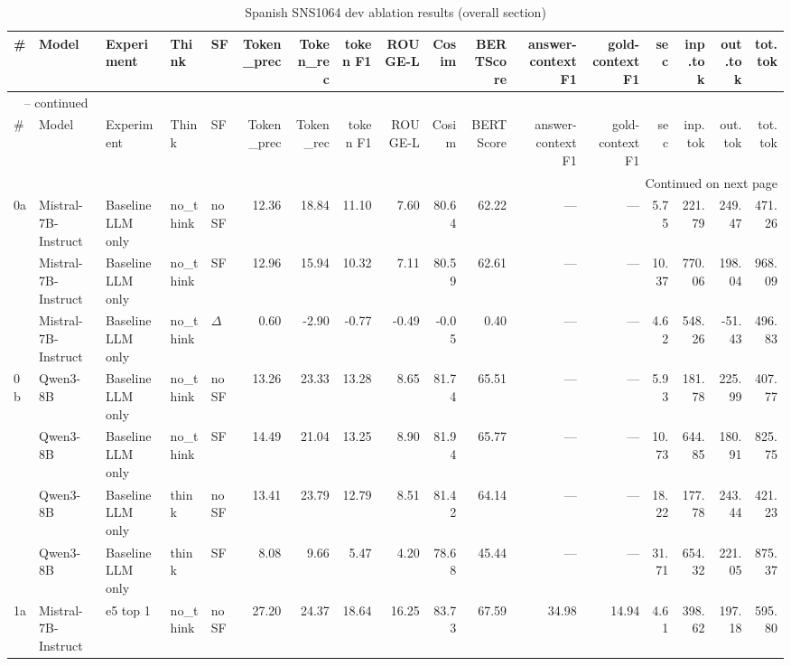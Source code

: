 \begin{landscape}
\begin{footnotesize}
\setlength{\LTcapwidth}{\linewidth}
\begin{longtable}{l l l l l r r r r r r r r r r r r}
\caption{Spanish SNS1064 dev ablation results (overall section)} \label{tab:es-sns} \\
\toprule
\# & Model & Experiment & Think & SF & Token\_prec & Token\_rec & token F1 & ROUGE-L & Cosim & BERTScore & answer-context F1 & gold-context F1 & sec & inp.tok & out.tok & tot.tok \\
\midrule
\endfirsthead
\multicolumn{17}{l}{\tablename\ \thetable{} -- continued} \\
\toprule
\# & Model & Experiment & Think & SF & Token\_prec & Token\_rec & token F1 & ROUGE-L & Cosim & BERTScore & answer-context F1 & gold-context F1 & sec & inp.tok & out.tok & tot.tok \\
\midrule
\endhead
\midrule
\multicolumn{17}{r}{Continued on next page} \\
\endfoot
\bottomrule
\endlastfoot
0a & Mistral-7B-Instruct & Baseline LLM only & no\_think & noSF & 12.36 & 18.84 & 11.10 & 7.60 & 80.64 & 62.22 & --- & --- & 5.75 & 221.79 & 249.47 & 471.26 \\
 & Mistral-7B-Instruct & Baseline LLM only & no\_think & SF & 12.96 & 15.94 & 10.32 & 7.11 & 80.59 & 62.61 & --- & --- & 10.37 & 770.06 & 198.04 & 968.09 \\
 & Mistral-7B-Instruct & Baseline LLM only & no\_think & $\Delta$ & 0.60 & -2.90 & -0.77 & -0.49 & -0.05 & 0.40 & --- & --- & 4.62 & 548.26 & -51.43 & 496.83 \\
0b & Qwen3-8B & Baseline LLM only & no\_think & noSF & 13.26 & 23.33 & 13.28 & 8.65 & 81.74 & 65.51 & --- & --- & 5.93 & 181.78 & 225.99 & 407.77 \\
 & Qwen3-8B & Baseline LLM only & no\_think & SF & 14.49 & 21.04 & 13.25 & 8.90 & 81.94 & 65.77 & --- & --- & 10.73 & 644.85 & 180.91 & 825.75 \\
 & Qwen3-8B & Baseline LLM only & think & noSF & 13.41 & 23.79 & 12.79 & 8.51 & 81.42 & 64.14 & --- & --- & 18.22 & 177.78 & 243.44 & 421.23 \\
 & Qwen3-8B & Baseline LLM only & think & SF & 8.08 & 9.66 & 5.47 & 4.20 & 78.68 & 45.44 & --- & --- & 31.71 & 654.32 & 221.05 & 875.37 \\
\midrule
1a & Mistral-7B-Instruct & e5 top 1 & no\_think & noSF & 27.20 & 24.37 & 18.64 & 16.25 & 83.73 & 67.59 & 34.98 & 14.94 & 4.61 & 398.62 & 197.18 & 595.80 \\

\end{longtable}
\end{footnotesize}
\end{landscape}
